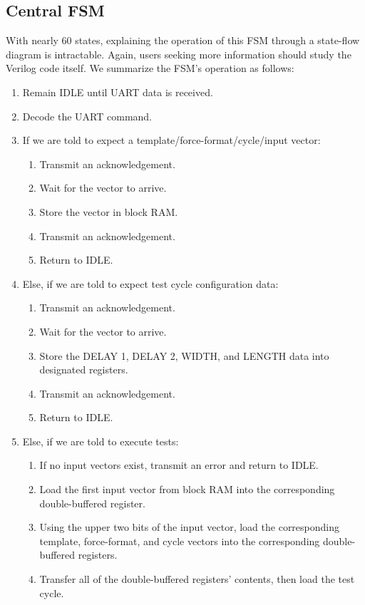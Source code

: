 \subsection{Central FSM}
With nearly 60 states, explaining the operation of this FSM through a state-flow diagram is intractable. Again, users seeking more information should study the Verilog code itself. We summarize the FSM's operation as follows: 
\begin{enumerate}
\item Remain IDLE until UART data is received.
\item Decode the UART command.
\item If we are told to expect a template/force-format/cycle/input vector: 
  \begin{enumerate}[label=\arabic*.]
    \item Transmit an acknowledgement.
    \item Wait for the vector to arrive.
    \item Store the vector in block RAM.
    \item Transmit an acknowledgement.
    \item Return to IDLE.
  \end{enumerate}
\item Else, if we are told to expect test cycle configuration data: 
  \begin{enumerate}[label=\arabic*.]
    \item Transmit an acknowledgement.
    \item Wait for the vector to arrive.
    \item Store the DELAY 1, DELAY 2, WIDTH, and LENGTH data into designated registers.
    \item Transmit an acknowledgement.
    \item Return to IDLE.
  \end{enumerate}
\item Else, if we are told to execute tests: 
  \begin{enumerate}[label=\arabic*.]
  	\item If no input vectors exist, transmit an error and return to IDLE.
    \item Load the first input vector from block RAM into the corresponding double-buffered register.
    \item Using the upper two bits of the input vector, load the corresponding template, force-format, and cycle vectors into the corresponding double-buffered registers.
    \item  Transfer all of the double-buffered registers' contents, then load the test cycle. 

\end{enumerate}
\end{enumerate}
